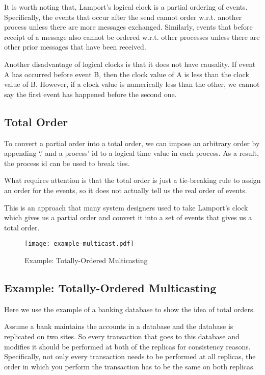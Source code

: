 \documentclass[twoside]{article}
\begin{document}
It is worth noting that, Lamport's logical clock is a partial ordering of events. Specifically, the events that occur after the send cannot order w.r.t. another process unless there are more messages exchanged. Similarly, events that before receipt of a message also cannot be ordered w.r.t. other processes unless there are other prior messages that have been received. 

Another disadvantage of logical clocks is that it does not have causality. If event A has occurred before event B, then the clock value of A is less than the clock value of B. However, if a clock value is numerically less than the other, we cannot say the first event has happened before the second one. 

\subsection{Total Order}

To convert a partial order into a total order, we can impose an arbitrary order by appending `.' and a process' id to a logical time value in each process. As a result, the process id can be used to break ties. 

What requires attention is that the total order is just a tie-breaking rule to assign an order for the events, so it does not actually tell us the real order of events.

This is an approach that many system designers used to take Lamport's clock which gives us a partial order and convert it into a set of events that gives us a total order.

\begin{figure}[t]
    \centering
    \texttt{[image: example-multicast.pdf]}
    \caption{Example: Totally-Ordered Multicasting}
    \label{fig:example}
\end{figure}

\subsection{Example: Totally-Ordered Multicasting}
Here we use the example of a banking database to show the idea of total orders. 

Assume a bank maintains the accounts in a database and the database is replicated on two sites. So every transaction that goes to this database and modifies it should be performed at both of the replicas for consistency reasons. Specifically, not only every transaction needs to be performed at all replicas, the order in which you perform the transaction has to be the same on both replicas. 
\end{document}
